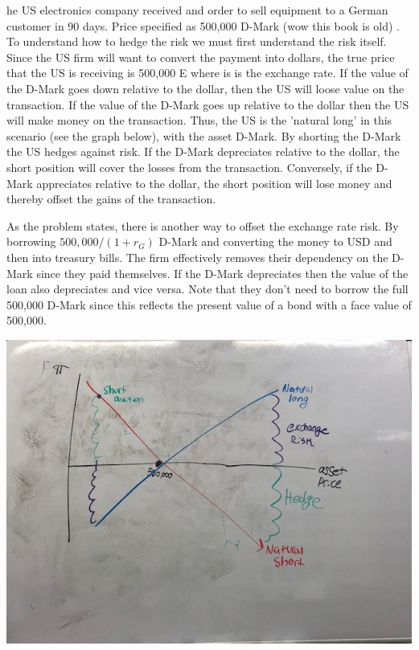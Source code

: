 \documentclass[12pt]{article}
\newenvironment{problem}[3][Problem]{\begin{trivlist}
\item[\hskip \labelsep {\bfseries #1}\hskip \labelsep {\bfseries #2.}]}{\end{trivlist}}
\begin{document}
\newpage
\begin{problem}{ 6 (Foreign Currency Alternative} The US electronics company received and order to sell equipment to a German customer in 90 days. Price specified as 500,000 D-Mark (wow this book is old) . To understand how to hedge the risk we must first understand the risk itself. Since the US firm will want to convert the payment into dollars, the true price that the US is receiving is 500,000 E where is is the exchange rate. If the value of the D-Mark goes down relative to the dollar, then the US will loose value on the transaction. If the value of the D-Mark goes up relative to the dollar then the US will make money on the transaction. Thus, the US is the 'natural long' in this scenario (see the graph below), with the asset D-Mark. By shorting the D-Mark the US hedges against risk.  If the D-Mark depreciates relative to the dollar, the short position will cover the losses from the transaction. Conversely, if the D-Mark appreciates relative to the dollar, the short position will lose money and thereby offset the gains of the transaction. 

As the problem states, there is another way to offset the exchange rate risk. By borrowing $500,000/(1+r_G)$ D-Mark and converting the money to USD and then into treasury bills. The firm effectively removes their dependency on the D-Mark since they paid themselves. If the D-Mark depreciates then the value of the loan also depreciates and vice versa. Note that they don't need to borrow the full 500,000 D-Mark since this reflects the present value of a bond with a face value of 500,000. \\
\begin{centering}
\includegraphics[width=\textwidth ]{mod9p6.jpg}
\end{centering}
\end{problem}
\end{document}
